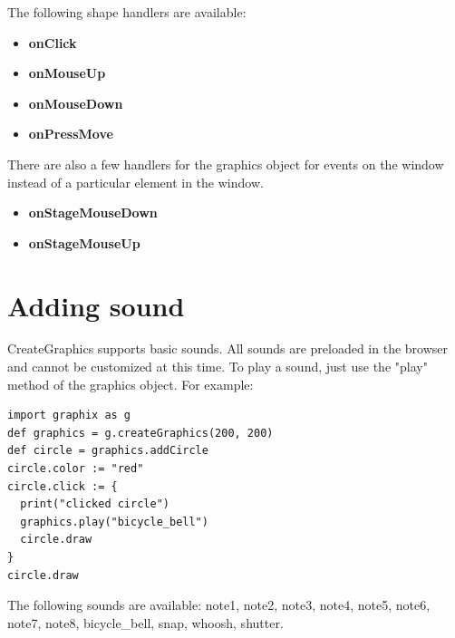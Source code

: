 \documentclass{article}
\begin{document}
The following shape handlers are available:
\begin{itemize}
\item \textbf{onClick} 
\item \textbf{onMouseUp}
\item \textbf{onMouseDown}
\item \textbf{onPressMove}
\end{itemize}

There are also a few handlers for the graphics object for events on the window instead of a
particular element in the window.
\begin{itemize}
\item \textbf{onStageMouseDown} 
\item \textbf{onStageMouseUp}
\end{itemize}

\section{Adding sound}
CreateGraphics supports basic sounds. All sounds are preloaded in the browser and cannot be customized at this time.
To play a sound, just use the "play" method of the graphics object. For example:
\begin{lstlisting}
import graphix as g
def graphics = g.createGraphics(200, 200)
def circle = graphics.addCircle
circle.color := "red"
circle.click := { 
  print("clicked circle") 
  graphics.play("bicycle_bell")
  circle.draw
}
circle.draw
\end{lstlisting}


The following sounds are available: note1, note2, note3, note4, note5, note6, note7, note8, bicycle\_bell, snap, 
whoosh, shutter.
\end{document}
